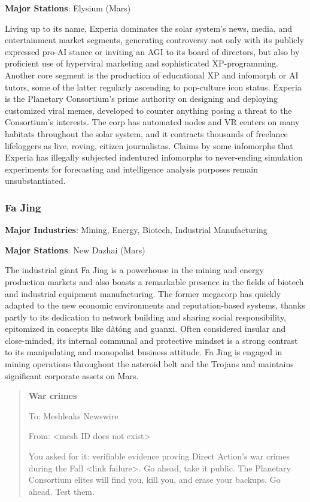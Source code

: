 \textbf{Major Stations}: Elysium (Mars)


Living up to its name, Experia dominates the solar system's news,
media, and entertainment market segments, generating controversy not
only with its publicly expressed pro-AI stance or inviting an AGI to
its board of directors, but also by proficient use of hyperviral
marketing and sophisticated XP-programming. Another core segment is
the production of educational XP and infomorph or AI tutors, some of
the latter regularly ascending to pop-culture icon status.  Experia is
the Planetary Consortium's prime authority on designing and deploying
customized viral memes, developed to counter anything posing a threat
to the Consortium's interests. The corp has automated nodes and VR
centers on many habitats throughout the solar system, and it contracts
thousands of freelance lifeloggers as live, roving, citizen
journalistas. Claims by some infomorphs that Experia has illegally
subjected indentured infomorphs to never-ending simulation experiments
for forecasting and intelligence analysis purposes remain
unsubstantiated.

\subsubsection{Fa Jing}
\label{sec:fa-jing}

\textbf{Major Industries}: Mining, Energy, Biotech, Industrial Manufacturing

\textbf{Major Stations}: New Dazhai (Mars)


The industrial giant Fa Jing is a powerhouse in the mining and energy
production markets and also boasts a remarkable presence in the fields
of biotech and industrial equipment manufacturing. The former megacorp
has quickly adapted to the new economic environments and
reputation-based systems, thanks partly to its dedication to network
building and sharing social responsibility, epitomized in concepts
like dàtóng and guanxi. Often considered insular and close-minded, its
internal communal and protective mindset is a strong contrast to its
manipulating and monopolist business attitude. Fa Jing is engaged in
mining operations throughout the asteroid belt and the Trojans and
maintains significant corporate assets on Mars.

\begin{quotation}
  \textbf{War crimes}
  
  To: Meshleaks Newswire

  From: <mesh ID does not exist>

  
  You asked for it: verifiable evidence proving Direct Action's war
  crimes during the Fall <link failure>. Go ahead, take it public. The
  Planetary Consortium elites will find you, kill you, and erase your
  backups. Go ahead. Test them.
\end{quotation}

